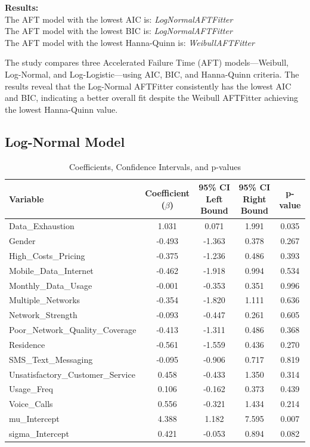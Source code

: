 \documentclass[doublespacing]{report} %
\begin{document}
\noindent
\textbf{Results:} \\
The AFT model with the lowest AIC is: \textit{LogNormalAFTFitter} \\
The AFT model with the lowest BIC is: \textit{LogNormalAFTFitter} \\
The AFT model with the lowest Hanna-Quinn is: \textit{WeibullAFTFitter}

The study compares three Accelerated Failure Time (AFT) models—Weibull, Log-Normal, and Log-Logistic—using AIC, BIC, and Hanna-Quinn criteria. The results reveal that the Log-Normal AFTFitter consistently has the lowest AIC and BIC, indicating a better overall fit despite the Weibull AFTFitter achieving the lowest Hanna-Quinn value.

\subsection{Log-Normal Model}

\begin{table}[H]
\centering
\caption{Coefficients, Confidence Intervals, and p-values}
\begin{tabular}{lcccc}
\hline
Variable & Coefficient ($\beta$) & 95\% CI Left Bound & 95\% CI Right Bound & p-value \\
\hline
Data\_Exhaustion & 1.031 & 0.071 & 1.991 & 0.035 \\
Gender & -0.493 & -1.363 & 0.378 & 0.267 \\
High\_Costs\_Pricing & -0.375 & -1.236 & 0.486 & 0.393 \\
Mobile\_Data\_Internet & -0.462 & -1.918 & 0.994 & 0.534 \\
Monthly\_Data\_Usage & -0.001 & -0.353 & 0.351 & 0.996 \\
Multiple\_Networks & -0.354 & -1.820 & 1.111 & 0.636 \\
Network\_Strength & -0.093 & -0.447 & 0.261 & 0.605 \\
Poor\_Network\_Quality\_Coverage & -0.413 & -1.311 & 0.486 & 0.368 \\
Residence & -0.561 & -1.559 & 0.436 & 0.270 \\
SMS\_Text\_Messaging & -0.095 & -0.906 & 0.717 & 0.819 \\
Unsatisfactory\_Customer\_Service & 0.458 & -0.433 & 1.350 & 0.314 \\
Usage\_Freq & 0.106 & -0.162 & 0.373 & 0.439 \\
Voice\_Calls & 0.556 & -0.321 & 1.434 & 0.214 \\
mu\_Intercept & 4.388 & 1.182 & 7.595 & 0.007 \\
sigma\_Intercept & 0.421 & -0.053 & 0.894 & 0.082 \\
\hline
\end{tabular}
\label{tab:LogNormal Coefficeints}
\end{table}
\end{document}
